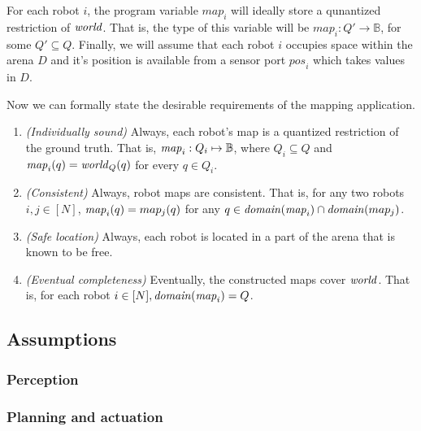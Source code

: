 For each robot $i$, the program variable $\mathit{map}_i$ will ideally store a qunantized restriction of $\mathit{world}$. That is, the type of this variable will be $\mathit{map}_i: Q' \rightarrow \mathbb{B}$, for some $Q' \subseteq Q$. 
%
Finally, we will assume that each robot $i$ occupies space within the arena $D$ and it's position is available from a sensor port $\mathit{pos}_i$ which takes values in $D$. 

Now we can formally state the desirable requirements of the mapping application.
\begin{enumerate}
	\item {\em (Individually sound)} Always, each robot's map is a quantized restriction of the ground truth. That is, $\mathit{map}_i: Q_i \mapsto \mathbb{B}$, where $Q_i\subseteq Q$ and  $\mathit{map}_i(q) = \mathit{world}_Q(q)$ for every $q\in Q_i$.
	\item {\em (Consistent)\/} Always, robot maps are consistent. That is, for any two robots $i,j \in [N]$,   $\mathit{map}_i(q) = map_j(q)$  for any  $q\in \mathit{domain}(\mathit{map}_i)  \cap \mathit{domain}(map_j)$.
	\item {\em (Safe location)\/} Always, each robot is located in a part of the arena that is known to be free. 

	\item {\em (Eventual completeness)} Eventually, the constructed maps cover $\mathit{world}$. That is, for each robot $i\in [N], \mathit{domain}(\mathit{map}_i) = Q$.
\end{enumerate}


\subsection{Assumptions}
\label{sec:formal:sensing}


\subsubsection{Perception}

\subsubsection{Planning and actuation}

